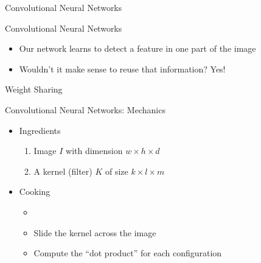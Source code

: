 \begin{slide}{Convolutional Neural Networks}
\end{slide}


\begin{slide}{Convolutional Neural Networks}
  \begin{itemize}
    \item Our network learns to detect a feature in one part of the image
    \item Wouldn't it make sense to reuse that information?
    \pitem Yes!
  \end{itemize}
  \vspace{0.5cm}
  {
    \Large
    Weight Sharing
  }
\end{slide}

\begin{slide}{Convolutional Neural Networks: Mechanics}
  \begin{itemize}
    \item<2-> Ingredients
    \begin{enumerate}
      \item<3-> Image $I$ with dimension $w \times h \times d$
      \item<4-> A kernel (filter) $K$ of size $k \times l \times m$
    \end{enumerate}
    \item<5-> Cooking
    \begin{itemize}
      \item<6-> 
      \item<8-> Slide the kernel across the image
      \item<9-> Compute the ``dot product'' for each configuration
    \end{itemize}
  \end{itemize}
\end{slide}

